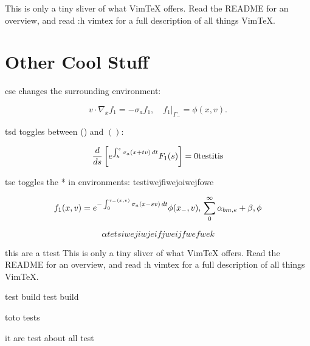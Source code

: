 \documentclass{article}
\begin{document}
This is only a tiny sliver of what VimTeX offers.
Read the README for an overview, and read :h vimtex for a full description of
all things VimTeX.




\section{Other Cool Stuff}

cse changes the surrounding environment:

\begin{equation}
  v \cdot \nabla_x f_1 = -\sigma_a f_1, \quad f_1 \rvert_{\Gamma_-} = \phi(x,v).
\end{equation}

tsd toggles between () and \( \left( \right) \):

\begin{equation*}
  \frac{d}{ds} \left[ e^{\int_k^s \sigma_a(x + tv)\,dt} F_1(s) \right] = 0 \\
	\rm{test it is}
\end{equation*}

tse toggles the * in environments:
testiwejfiwejoiwejfowe

\begin{equation}
  f_1(x, v) = e^{-\int_0^{\tau_-(x, v)} \sigma_a(x - sv)\,dt} \phi(x_-, v),\\
	\sum_0^\infty {\alpha_{bm,e} + \beta, \phi}
\end{equation}

\begin{equation}
	\alpha tets
	iwejiwjeifjweijfwefwek
\end{equation}

this are a ttest
This is only a tiny sliver of what VimTeX offers.
Read the README for an overview, and read :h vimtex for a full description of
all things VimTeX.

test build
test build 

toto tests

it are test about
all
test
\end{document}
